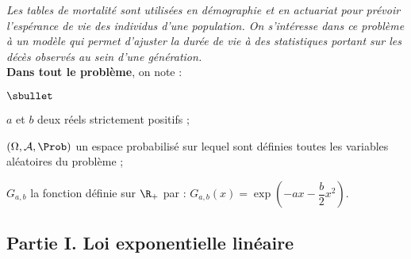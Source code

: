 \noindent %
{\it Les tables de mortalité sont utilisées en démographie et en
  actuariat pour prévoir l'espérance de vie des individus d'une
  population. On s'intéresse dans ce problème à un modèle qui permet
  d'ajuster la durée de vie à des statistiques portant sur les décès
  observés au sein d'une génération.}\\
{\bf Dans tout le problème}, on note :
\begin{noliste}{$\sbullet$}
\item $a$ et $b$ deux réels strictement positifs ;
\item $(\Omega,\mathcal{A},\Prob)$ un espace probabilisé sur lequel sont
  définies toutes les variables aléatoires du problème ;
\item $G_{a,b}$ la fonction définie sur $\R_+$ par :
  $G_{a,b}(x)=\exp\left(-ax-\dfrac{b}{2}x^2\right)$.
\end{noliste}

\subsection*{Partie I. Loi exponentielle linéaire}


